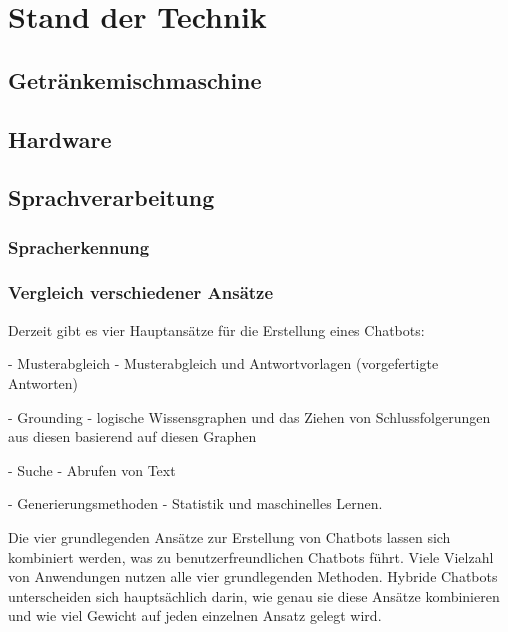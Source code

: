 \chapter{Stand der Technik}
\section{Getränkemischmaschine}
\section{Hardware}
\section{Sprachverarbeitung}
\subsection{Spracherkennung}
\subsection{Vergleich verschiedener Ansätze}
Derzeit gibt es vier Hauptansätze für die Erstellung eines Chatbots:

- Musterabgleich - Musterabgleich und Antwortvorlagen (vorgefertigte Antworten)

- Grounding - logische Wissensgraphen und das Ziehen von Schlussfolgerungen aus diesen basierend auf diesen Graphen

- Suche - Abrufen von Text

- Generierungsmethoden - Statistik und maschinelles Lernen.

Die vier grundlegenden Ansätze zur Erstellung von Chatbots lassen sich kombiniert werden, was zu benutzerfreundlichen Chatbots führt. Viele Vielzahl von Anwendungen nutzen alle vier grundlegenden Methoden. Hybride Chatbots unterscheiden sich hauptsächlich darin, wie genau sie diese Ansätze kombinieren und wie viel Gewicht auf jeden einzelnen Ansatz gelegt wird.
